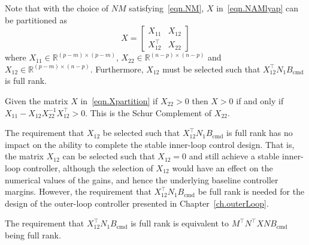 Note that with the choice of $NM$ satisfying\ \eqref{eqn.NM}, $X$ in\ \eqref{eqn.NAMlyap} can be partitioned as
\begin{equation}
  \label{eqn.Xpartition}
  X=
  \begin{bmatrix}
    X_{11} & X_{12} \\
    X_{12}^{\top} & X_{22}
  \end{bmatrix}
\end{equation}
where $X_{11}\in\mathbb{R}^{(p-m)\times(p-m)}$, $X_{22}\in\mathbb{R}^{(n-p)\times(n-p)}$ and $X_{12}\in\mathbb{R}^{(p-m)\times(n-p)}$.
Furthermore, $X_{12}$ must be selected such that $X_{12}^{\top}N_{1}B_{\text{cmd}}$ is full rank.

\begin{prop-dan}
  Given the matrix $X$ in\ \eqref{eqn.Xpartition} if $X_{22}>0$ then $X>0$ if and only if $X_{11}-X_{12}X_{22}^{-1}X_{12}^{\top}>0$.
  This is the Schur Complement of $X_{22}$.
\end{prop-dan}

\begin{rem-dan}\label{rem.X12FullRank}
  The requirement that $X_{12}$ be selected such that $X_{12}^{\top}N_{1}B_{\text{cmd}}$ is full rank has no impact on the ability to complete the stable inner-loop control design.
  That is, the matrix $X_{12}$ can be selected such that $X_{12}=0$ and still achieve a stable inner-loop controller, although the selection of $X_{12}$ would have an effect on the numerical values of the gains, and hence the underlying baseline controller margins.
  However, the requirement that $X_{12}^{\top}N_{1}B_{\text{cmd}}$ be full rank is needed for the design of the outer-loop controller presented in Chapter~\ref{ch.outerLoop}.
\end{rem-dan}

\begin{lem-dan}
  The requirement that $X_{12}^{\top}N_{1}B_{\text{cmd}}$ is full rank is equivalent to $M^{\top}N^{\top}XNB_{\text{cmd}}$ being full rank.
\end{lem-dan}

